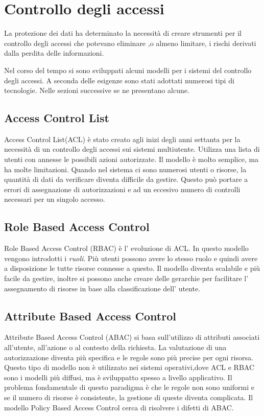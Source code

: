 \label{chap:Access Control e Usage Control}
\section{Controllo degli accessi}
\label{sec:Controllo degli accessi}
La protezione dei dati ha determinato la necessità di creare strumenti per il controllo degli accessi che potevano eliminare
,o almeno limitare, i rischi derivati dalla perdita delle informazioni.\par
Nel corso del tempo si sono sviluppati alcuni modelli per i sistemi del controllo degli accessi. A seconda delle esigenze
sono stati adottati numerosi tipi di tecnologie\cite{NISTACM}. Nelle sezioni successive se ne presentano alcune.
\subsection{Access Control List}
\label{sub:ACL}
Access Control List(ACL) è stato creato agli inizi degli anni settanta per la necessità di un controllo degli
accessi sui sistemi multiutente.
Utilizza una lista di utenti con annesse le possibili azioni autorizzate. Il modello è molto semplice,
ma ha molte limitazioni. Quando nel sistema ci sono numerosi utenti o risorse, la quantità di dati da verificare diventa
difficile da gestire. Questo può portare a errori di assegnazione di autorizzazioni e ad un eccesivo numero di controlli
necessari per un singolo accesso.
\subsection{Role Based Access Control}
\label{sub:RBAC}
Role Based Access Control (RBAC) è l' evoluzione di ACL. In questo modello vengono introdotti i \emph{ruoli}. Più utenti
possono avere lo stesso ruolo e quindi avere a disposizione le tutte risorse connesse a questo. Il modello
diventa scalabile e più facile da gestire, inoltre si possono anche creare delle gerarchie per facilitare l' assegnamento di
risorse in base alla classificazione dell' utente.
\subsection{Attribute Based Access Control}
\label{sub:ABAC}
Attribute Based Access Control (ABAC) si basa sull'utilizzo di attributi associati all'utente, all'azione o al contesto
della richiesta. La valutazione di una autorizzazione diventa più specifica e le regole sono più precise per ogni risorsa.
Questo tipo di modello non è utilizzato nei sistemi operativi,dove ACL e RBAC sono i modelli più diffusi, ma è sviluppatto
spesso a livello applicativo. Il problema fondamentale di questo paradigma è che le regole non sono uniformi e se il numero
di risorse è consistente, la gestione di queste diventa complicata. Il modello Policy Based Access Control cerca di
risolvere i difetti di ABAC.
